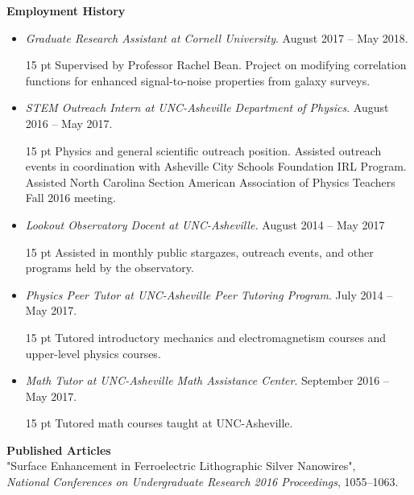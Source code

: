 \documentclass[a4paper, 11pt]{article}
\newcommand{\noi}{\noindent}
\newcommand{\ind}{\indent}
\newenvironment{pari}{\begin{adjustwidth}{15 pt}{}}{\end{adjustwidth}}
\begin{document}
\noi \textbf{Employment History}
\begin{itemize}[leftmargin=*]
	\item \noi \emph{Graduate Research Assistant at Cornell University}. August 2017 -- May 2018.
	\begin{pari}
		Supervised by Professor Rachel Bean. Project on modifying correlation functions for enhanced signal-to-noise properties from galaxy surveys.
	\end{pari}

	\item \noi \emph{STEM Outreach Intern at UNC-Asheville Department of Physics}. August 2016 -- May 2017.
	\begin{pari}
		Physics and general scientific outreach position. Assisted outreach events in coordination with Asheville City Schools Foundation IRL Program. Assisted North Carolina Section American Association of Physics Teachers Fall 2016 meeting.
	\end{pari}

	\item \noi \emph{Lookout Observatory Docent at UNC-Asheville.} August 2014 -- May 2017
		\begin{pari}
			\noi Assisted in monthly public stargazes, outreach events, and other programs held by the observatory.
		\end{pari}

	\item \noi \emph{Physics Peer Tutor at UNC-Asheville Peer Tutoring Program}. July 2014 -- May 2017.
	\begin{pari}
	\noi Tutored introductory mechanics and electromagnetism courses and upper-level physics courses.
	\end{pari}

	\item \noi \emph{Math Tutor at UNC-Asheville Math Assistance Center}.  September 2016 -- May 2017.
	\begin{pari}
		\noi Tutored math courses taught at UNC-Asheville. 
	\end{pari}
\end{itemize}

\noi \textbf{Published Articles}
\\

\noi "Surface Enhancement in Ferroelectric Lithographic Silver Nanowires", 
\\
	\ind \emph{National Conferences on Undergraduate Research 2016 Proceedings}, 1055--1063.
\\
\end{document}
